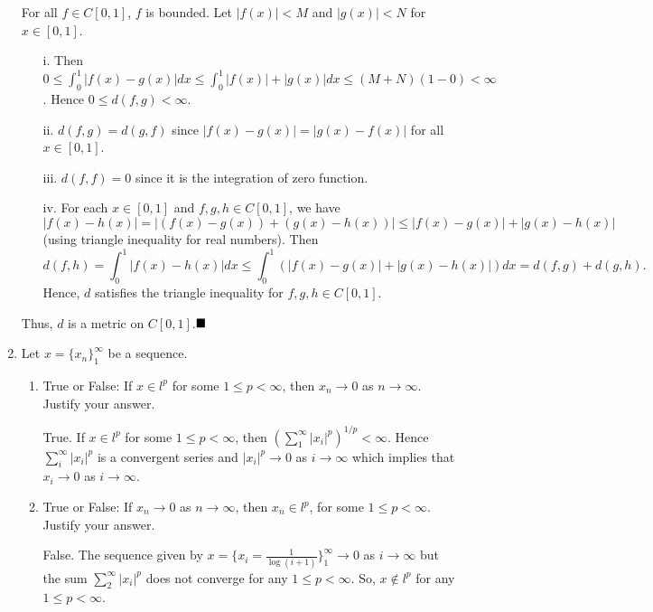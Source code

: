 \documentclass[12pt]{article}
\newcommand{\qed}{$\hfill\blacksquare$}
\begin{document}
\begin{enumerate}
\begin{mybox}
For all $f\in C[0,1]$, $f$ is bounded. Let $|f(x)|<M$ and
$|g(x)|<N$ for $x\in[0,1]$.
  \begin{enumerate}
    \item[i.]
      Then $0\leq\int_0^1{|f(x)-g(x)| dx}\leq
      \int_0^1{|f(x)|+|g(x)| dx}\leq (M+N)(1-0)<\infty$.
      Hence
      $0\leq d(f,g)<\infty$.
    \item[ii.]
      $d(f,g)=d(g,f)$ since $|f(x)-g(x)|=|g(x)-f(x)|$
      for all $x\in[0,1]$.
    \item[iii.]
      $d(f,f)=0$ since it is the integration of zero function.
    \item[iv.]
      For each $x\in [0,1]$ and $f,g,h\in C[0,1]$, we have
      $|f(x)-h(x)|=|(f(x)-g(x))+(g(x)-h(x))|
      \leq |f(x)-g(x)|+|g(x)-h(x)|$ (using triangle inequality
      for real numbers). Then
      $$d(f,h)=\int_{0}^1{ |f(x) - h(x)| dx}\leq
      \int_{0}^1{\left(|f(x) - g(x)|+|g(x)-h(x)|\right) dx}
      =d(f,g)+d(g,h).$$
      Hence, $d$ satisfies the triangle inequality
      for $f,g,h\in C[0,1]$.
  \end{enumerate}
  Thus, $d$ is a metric on $C[0,1] $.\qed
\end{mybox}
  
\item   Let $x = \{x_n\}_1^{\infty}$ be a sequence. 
\begin{enumerate} 
\item True or False: If $x \in l^p$ for some $1 \leq p < \infty$, then  $x_n \to 0$ as $n \to \infty$. Justify your answer.
\begin{mybox}

  True. If $x\in l^p$ for some $1\leq p<\infty$, then
  $\left(\sum_1^{\infty}{|x_i|^p}\right)^{1/p}<\infty$.
  Hence $\sum_i^{\infty}{|x_i|^p}$ is a convergent series
  and $|x_i|^p\to 0$ as $i\to \infty$ which implies that
  $x_i\to 0$ as $i\to\infty$.
\end{mybox}
\item True or False: If $x_n \to 0$ as $n \to \infty$, then $x_n \in l^p$, for some $1 \leq p < \infty$. Justify your answer.
\begin{mybox}

  False. The sequence given by $x= \{x_i=\frac{1}{\log (i+1)}\}_1^{\infty}
  \to 0$ as $i\to \infty$ but the sum $\sum_2^{\infty}{
    |x_i|^p
  }$ does not converge for any $1\leq p<\infty$.
  So, $x\notin l^p$ for any $1\leq p<\infty$.
\end{mybox}
 \end{enumerate}
 

\end{enumerate}
\end{document}
